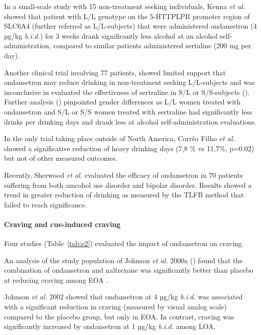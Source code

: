 In a small-scale study with 15 non-treatment seeking individuals, Kenna \textit{et al.} \cite{kenna_within-group_2009} showed that patient with L/L genotype on the 5-HTTPLPR promoter region of SLC6A4 (further referred as L/L-subjects) that were administered ondansetron (4 µg/kg \emph{b.i.d.}) for 3 weeks drank significantly less alcohol at an alcohol self-administration, compared to similar patients administered sertaline (200 mg per day).

Another clinical trial involving 77 patients, showed limited support that ondansetron may reduce drinking in non-treatment seeking L/L-subjects and was inconclusive in evaluated the effectivness of sertraline in S/L or S/S-subjects (\cite{kenna_ondansetron_2014-1}). Further analysis (\cite{kenna_ondansetron_2014}) pinpointed gender differences as L/L women treated with ondansetron and S/L or S/S women treated with sertraline had significantly less drinks per drinking days and drank less at alcohol self-administration evaluations.

In the only trial taking place outside of North America, Corrêa Filho \textit{et al.} \cite{correa_filho_pilot_2013} showed a significative reduction of heavy drinking days (7,8 \% vs 11,7\%, p=0.02) but not of other measured outcomes.

Recently, Sherwood \textit{et al.} \cite{sherwood_brown_randomized_2021} evaluated the efficacy of ondansetron in 70 patients suffering from both amcohol use disorder and bipolar disorder. Results showed a trend in greater reduction of drinking as measured by the TLFB method that failed to reach significance.

\paragraph{Craving and cue-induced craving}
Four studies (Table~\ref{tab:e2}) evaluated the impact of ondansetron on craving.

An analysis of the study population of Johnson \textit{et al.} 2000a (\cite{johnson_combining_2000}) found that the combination of ondansetron and naltrexone was significantly better than placebo at reducing craving among EOA \cite{ait-daoud_combining_2001}.

Johnson \textit{et al.} 2002 \cite{johnson_ondansetron_2002} showed that ondansetron at 4 µg/kg \emph{b.i.d.} was associated with a significant reduction in craving (measured by visual analog scale) compared to the placebo group, but only in EOA. In contrast, craving was significantly increased by ondansetron at 1 µg/kg \emph{b.i.d.} among LOA.

